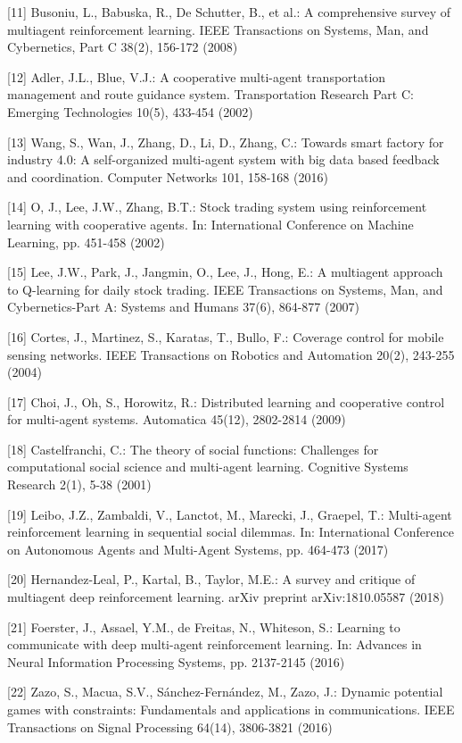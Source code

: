 \documentclass[10pt]{article}
\begin{document}
[11] Busoniu, L., Babuska, R., De Schutter, B., et al.: A comprehensive survey of multiagent reinforcement learning. IEEE Transactions on Systems, Man, and Cybernetics, Part C 38(2), 156-172 (2008)

[12] Adler, J.L., Blue, V.J.: A cooperative multi-agent transportation management and route guidance system. Transportation Research Part C: Emerging Technologies 10(5), 433-454 (2002)

[13] Wang, S., Wan, J., Zhang, D., Li, D., Zhang, C.: Towards smart factory for industry 4.0: A self-organized multi-agent system with big data based feedback and coordination. Computer Networks 101, 158-168 (2016)

[14] O, J., Lee, J.W., Zhang, B.T.: Stock trading system using reinforcement learning with cooperative agents. In: International Conference on Machine Learning, pp. 451-458 (2002)

[15] Lee, J.W., Park, J., Jangmin, O., Lee, J., Hong, E.: A multiagent approach to Q-learning for daily stock trading. IEEE Transactions on Systems, Man, and Cybernetics-Part A: Systems and Humans 37(6), 864-877 (2007)

[16] Cortes, J., Martinez, S., Karatas, T., Bullo, F.: Coverage control for mobile sensing networks. IEEE Transactions on Robotics and Automation 20(2), 243-255 (2004)

[17] Choi, J., Oh, S., Horowitz, R.: Distributed learning and cooperative control for multi-agent systems. Automatica 45(12), 2802-2814 (2009)

[18] Castelfranchi, C.: The theory of social functions: Challenges for computational social science and multi-agent learning. Cognitive Systems Research 2(1), 5-38 (2001)

[19] Leibo, J.Z., Zambaldi, V., Lanctot, M., Marecki, J., Graepel, T.: Multi-agent reinforcement learning in sequential social dilemmas. In: International Conference on Autonomous Agents and Multi-Agent Systems, pp. 464-473 (2017)

[20] Hernandez-Leal, P., Kartal, B., Taylor, M.E.: A survey and critique of multiagent deep reinforcement learning. arXiv preprint arXiv:1810.05587 (2018)

[21] Foerster, J., Assael, Y.M., de Freitas, N., Whiteson, S.: Learning to communicate with deep multi-agent reinforcement learning. In: Advances in Neural Information Processing Systems, pp. 2137-2145 (2016)

[22] Zazo, S., Macua, S.V., Sánchez-Fernández, M., Zazo, J.: Dynamic potential games with constraints: Fundamentals and applications in communications. IEEE Transactions on Signal Processing 64(14), 3806-3821 (2016)
\end{document}
